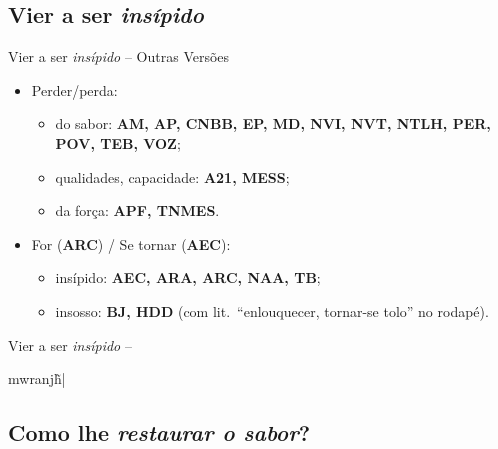 \documentclass[12pt,aspectratio=169]{beamer}
\newcommand{\YEL}[1]{{\textcolor{TXyel}{#1}}}
\newcommand{\BRI}[1]{{\textcolor{BSpbg}{#1}}}   %
\newcommand{\GRtxt}[1]{\begin{otherlanguage}{greek}{{#1}}\end{otherlanguage}}
\begin{document}
    \subsection{Vier a ser \textit{insípido\/}}

    \begin{frame}{\BRI{Vier a ser \YEL{\textit{insípido\/}} -- Outras Versões}}
        \begin{itemize}
            \item<1-> \YEL{Perder/perda}:
                \begin{itemize}
                    \item<1-> \YEL{do sabor}: \BRI{\textbf{AM, AP, CNBB, EP, MD, NVI, NVT, NTLH,
                        PER, POV, TEB, VOZ}};
                    \item<2-> \YEL{qualidades, capacidade}: \BRI{\textbf{A21, MESS}};
                    \item<3-> \YEL{da força}: \BRI{\textbf{APF, TNMES}}.
                \end{itemize}
            \item<3-> \YEL{For} (\BRI{\bf ARC}) / \YEL{Se tornar} (\BRI{\bf AEC}):
                \begin{itemize}
                    \item<4-> \YEL{insípido}: \BRI{\textbf{AEC, ARA, ARC, NAA, TB}};
                    \item<5-> \YEL{insosso}: \BRI{\textbf{BJ, HDD}} (com lit.~``enlouquecer,
                        tornar-se tolo'' no rodapé).
                \end{itemize}
        \end{itemize}
    \end{frame}

    \begin{frame}{\BRI{Vier a ser \YEL{\textit{insípido\/}} -- \GRtxt{mwranj\~h|}}}
    \end{frame}

    \subsection{Como lhe \textit{restaurar o sabor\/}?}
\end{document}
